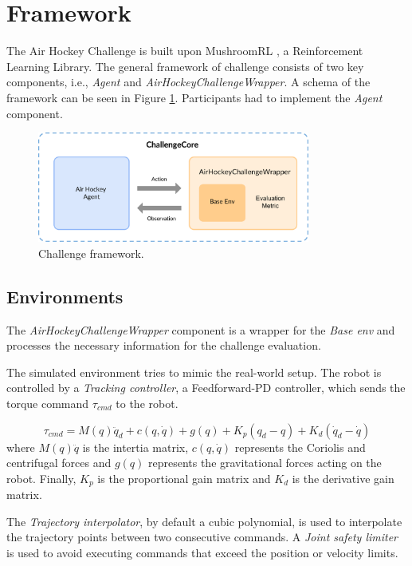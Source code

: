\section{Framework}
The Air Hockey Challenge is built upon MushroomRL \cite{mushroom_rl}, a Reinforcement Learning Library.
The general framework of challenge consists of two key components, i.e., \textit{Agent} and \textit{AirHockeyChallengeWrapper}.
A schema of the framework can be seen in Figure \ref{fig:framework}.
Participants had to implement the \textit{Agent} component.

\begin{figure}[H]
    \centering
    \includegraphics[width=0.8\textwidth]{Images/framework.png}
    \caption{Challenge framework.}
    \label{fig:framework}
\end{figure}

\subsection{Environments}
    The \textit{AirHockeyChallengeWrapper} component is a wrapper for the \textit{Base env} and processes the necessary information for the challenge evaluation.

    The simulated environment tries to mimic the real-world setup. The robot is controlled by a \textit{Tracking controller}, a Feedforward-PD controller, which sends 
    the torque command $\tau_{cmd}$ to the robot.

    \begin{equation*}
        \tau_{cmd} = M(q)\ddot{q}_d + c(q,\dot{q}) + g(q) + K_p(q_d - q) + K_d(\dot{q}_d - \dot{q})
    \end{equation*}
    where $M(q)\ddot{q}$ is the intertia matrix, $c(q,\dot{q})$ represents the Coriolis and centrifugal forces and $g(q)$ represents the gravitational forces acting on the robot.
    Finally, $K_p$ is the proportional gain matrix and $K_d$ is the derivative gain matrix. 

    The \textit{Trajectory interpolator}, by default a cubic polynomial, is used to interpolate the trajectory points between two consecutive commands.
    A \textit{Joint safety limiter} is used to avoid executing commands that exceed the position or velocity limits.

